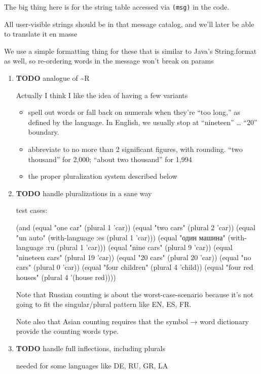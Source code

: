\documentclass[11pt]{article}
\begin{document}
\begin{enumerate}
\begin{enumerate}
\begin{enumerate}
\begin{enumerate}
The big thing here is for the string table accessed via \texttt{(msg)} in
the code.

All user-visible strings should be in that message catalog, and we'll
later be able to translate it en masse

We use a simple formatting thing for these that is similar to Java's
String.format as well, so re-ordering words in the message won't
break on params

\begin{enumerate}
\item {\bfseries\sffamily TODO} analogue of \textasciitilde{}R
\label{sec-5-4-1-4-2-7-1}

Actually I think I like the idea of having a few variants

\begin{itemize}
\item spell out words or fall back on numerals when they're “too long,”
as defined by the language. In English, we usually stop at
“nineteen” … “20” boundary.
\item abbreviate to no more than 2 significant figures, with
rounding. “two thousand” for 2,000; “about two thousand” for
1,994
\item the proper pluralization system described below
\end{itemize}
\item {\bfseries\sffamily TODO} handle pluralizations in a sane way
\label{sec-5-4-1-4-2-7-2}

test cases:

(and (equal "one car" (plural 1 'car))
     (equal "two cars" (plural 2 'car))
     (equal "un auto" (with-language :es (plural 1 'car)))
     (equal "один машина" (with-language :ru (plural 1 'car)))
     (equal "nine cars" (plural 9 'car))
     (equal "nineteen cars" (plural 19 'car))
     (equal "20 cars" (plural 20 'car))
     (equal "no cars" (plural 0 'car))
     (equal "four children" (plural 4 'child))
     (equal "four red houses" (plural 4 '(house red))))

Note that Russian counting is about the worst-case-scenario because
it's not going to fit the singular/plural pattern like EN, ES, FR.

Note also that Asian counting requires that the symbol → word
dictionary provide the counting words type.
\item {\bfseries\sffamily TODO} handle full inflections, including plurals
\label{sec-5-4-1-4-2-7-3}

needed for some languages like DE, RU, GR, LA


\end{enumerate}
\end{enumerate}
\end{enumerate}
\end{enumerate}
\end{enumerate}
\end{document}
